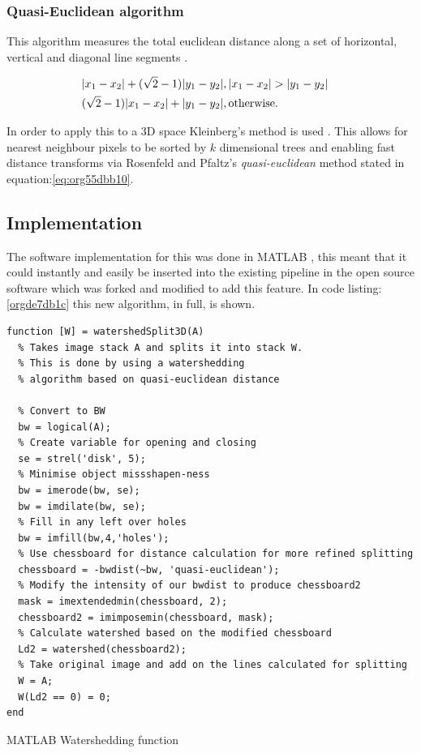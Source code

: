 \documentclass[11pt]{report}
\begin{document}
\subsubsection{Quasi-Euclidean algorithm}
\label{sec:orgbf4c3c9}

This algorithm measures the total euclidean distance along a set of horizontal, vertical and diagonal
line segments \cite{Pfaltz1966}.

\begin{align}
\label{eq:org55dbb10}
  &\begin{aligned}
&|x_1-x_2|+(\sqrt{2}-1)|y_1-y_2|, |x_1-x_2| > |y_1-y_2| \\
      &(\sqrt{2}-1)|x_1-x_2| + |y_1-y_2|, \textup{otherwise.}
  \end{aligned}
\end{align}

In order to apply this to a 3D space Kleinberg's method is used  \cite{Kleinberg1997}. This allows for nearest neighbour pixels to be sorted by \(k\) dimensional trees
and enabling fast distance transforms via Rosenfeld and Pfaltz's \emph{quasi-euclidean} method stated in equation:\ref{eq:org55dbb10}.

\subsection{Implementation}
\label{sec:orgb889237}

The software implementation for this was done in MATLAB \cite{MATHWORKS2017}, this meant that it could instantly and easily be inserted into the existing pipeline in the open source software which was forked and modified to add this feature. In code listing:\ref{orgde7db1c} this new algorithm, in full, is shown.

\begin{listing}[htbp]
\begin{verbatim}
function [W] = watershedSplit3D(A)
  % Takes image stack A and splits it into stack W.
  % This is done by using a watershedding
  % algorithm based on quasi-euclidean distance

  % Convert to BW
  bw = logical(A);
  % Create variable for opening and closing
  se = strel('disk', 5);
  % Minimise object missshapen-ness
  bw = imerode(bw, se);
  bw = imdilate(bw, se);
  % Fill in any left over holes
  bw = imfill(bw,4,'holes');
  % Use chessboard for distance calculation for more refined splitting
  chessboard = -bwdist(~bw, 'quasi-euclidean');
  % Modify the intensity of our bwdist to produce chessboard2
  mask = imextendedmin(chessboard, 2);
  chessboard2 = imimposemin(chessboard, mask);
  % Calculate watershed based on the modified chessboard
  Ld2 = watershed(chessboard2);
  % Take original image and add on the lines calculated for splitting
  W = A;
  W(Ld2 == 0) = 0;
end
\end{verbatim}
\caption{\label{orgde7db1c}
MATLAB Watershedding function}
\end{listing}
\end{document}
